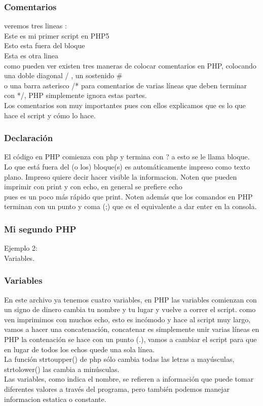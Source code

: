 \documentclass[]{beamer}
\begin{document}
\begin{frame}\frametitle{Comentarios}
veremos tres lineas : \\
Este es mi primer script en PHP5 \\
Esto esta fuera del bloque \\
Esta es otra linea \\
como pueden ver existen tres maneras de colocar comentarios en PHP, colocando una doble diagonal  / , un sostenido # \\
o una barra asterisco /* para comentarios de varias líneas que deben terminar con */, PHP simplemente ignora estas partes. \\
Los comentarios son muy importantes pues con ellos explicamos que es lo que hace el script y cómo lo hace. \\
\end{frame}

\begin{frame}\frametitle{Declaración}
El código en PHP comienza con \alert{php} y termina con \alert{?} a esto se le llama bloque. Lo que está fuera del (o los) bloque(s) es automáticamente impreso como texto plano. Impreso quiere decir hacer visible la informacion. Noten que pueden imprimir con print y con echo, en general se prefiere echo \\
pues es un poco más rápido que print. Noten además que los comandos en PHP terminan con un punto y coma (;) que es el equivalente a dar enter en la consola. \\
\end{frame}

\begin{frame}\frametitle{Mi segundo PHP}
Ejemplo 2:  \\
Variables. \\
\end{frame}

\begin{frame}\frametitle{Variables}
En este archivo ya tenemos cuatro variables, en PHP las variables comienzan con un signo de dinero cambia tu nombre y tu lugar y vuelve a correr el script.
como ven imprimimos con muchos echo, esto es incómodo y hace al script muy largo, vamos a hacer una concatenación, concatenar es simplemente unir varias líneas en PHP la contenación se hace con un punto (.), vamos a cambiar el script para que en lugar de todos los echos quede una sola línea. \\

La función strtoupper() de php sólo cambia todas las letras a mayúsculas, strtolower() las cambia a minúsculas. \\
Las variables, como indica el nombre, se refieren a información que puede tomar diferentes valores a través del programa,
pero también podemos manejar informacion estatica o constante. \\
\end{frame}
\end{document}
